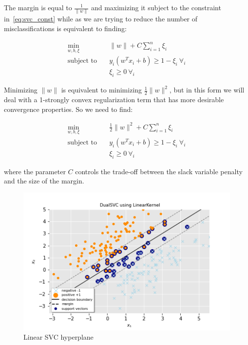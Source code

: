 The margin is equal to $\displaystyle \frac{1}{\| w \|}$ and maximizing it subject to the constraint in~\eqref{eq:svc_const} while as we are trying to reduce the number of misclassifications is equivalent to finding:

\begin{equation} \label{eq:svc_obj}
    \begin{aligned}
        \min_{w,b,\xi} \quad & \| w \| + C \sum_{i=1}^n \xi_i \\
            \text{subject to} \quad & y_i (w^T x_i + b) \geq 1 - \xi_i \ \forall_i \\ & \xi_i \geq 0 \ \forall_i
    \end{aligned}
\end{equation}

Minimizing $\| w \|$ is equivalent to minimizing $\displaystyle \frac{1}{2} \| w \|^2$, but in this form we will deal with a 1-strongly convex regularization term that has more desirable convergence properties. So we need to find:

\begin{equation} \label{eq:quad_svc_obj}
    \begin{aligned}
        \min_{w,b,\xi} \quad & \frac{1}{2} \| w \|^2 + C \sum_{i=1}^n \xi_i \\
            \text{subject to} \quad & y_i (w^T x_i + b) \geq 1 - \xi_i \ \forall_i \\ & \xi_i \geq 0 \ \forall_i
    \end{aligned}
\end{equation}

where the parameter $C$ controls the trade-off between the slack variable penalty and the size of the margin.

\begin{figure}[h!]
	\centering
	\includegraphics[scale=0.6]{img/linear_dual_l1_svc_hyperplane}
	\caption{Linear SVC hyperplane}
	\label{fig:linear_dual_l1_svc_hyperplane}
\end{figure}

